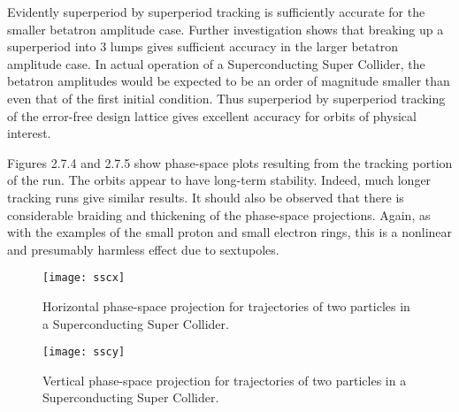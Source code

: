      Evidently superperiod by superperiod tracking is sufficiently accurate
for the smaller betatron amplitude case.  Further investigation shows that
breaking up a superperiod into 3 lumps gives sufficient accuracy in the
larger betatron amplitude case.  In actual operation of a Superconducting
Super Collider, the betatron amplitudes would be expected to be an order of
magnitude smaller than even that of the first initial condition.  Thus
 superperiod by superperiod tracking of the error-free design
lattice gives excellent accuracy for orbits of physical interest.

     Figures 2.7.4 and 2.7.5 show phase-space plots resulting from the tracking
portion of the \Mary run.  The orbits appear to have long-term stability.
Indeed, much longer tracking runs give similar results.  It should also be
observed that there is considerable braiding and thickening of the
phase-space projections.  Again, as with the examples of the small proton
and small electron rings, this is a nonlinear and presumably harmless
effect due to sextupoles.

\begin{figure}[hbp]
  \centering
  \texttt{[image: sscx]}
  \caption{Horizontal phase-space projection for trajectories
      of two particles in a Superconducting Super Collider.}
\end{figure}


\begin{figure}[hbp]
  \centering
  \texttt{[image: sscy]}
  \caption{Vertical phase-space projection for trajectories
       of two particles in a Superconducting Super Collider.
}
\end{figure}
